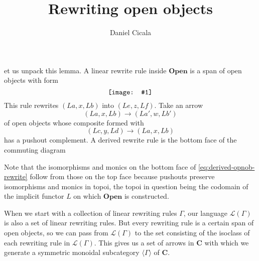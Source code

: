 \documentclass{amsart}
\author{Daniel Cicala}
\title{Rewriting open objects}
\newcommand{\C}{\cat{C}}
\newcommand{\cat}[1]{\mathbf{#1}}
\newcommand{\diagram}[1]{\raisebox{-0.5\height}{\texttt{[image: \#1]}}}
\newcommand{\OpenOb}{\mathbf{Open} }
\newenvironment{exposition}[1]{}{}
\theoremstyle{remark}
\theoremstyle{definition}
\begin{document}
\begin{exposition}

  Let us unpack this lemma.  A linear rewrite rule inside \( \OpenOb \) is
  a span of open objects with form
  \[
    \diagram{diag_lr_rewr-struct-cospans}
  \]
  This rule rewrites \( ( La , x , Lb ) \)
  into \( (  Le , z , Lf ) \). Take an arrow 
  \[
    ( La , x , Lb ) \to ( La' , w , Lb' )
  \]
  of open objects whose composite formed with
  \[
    ( Lc , y , Ld) \to ( La , x , Lb)
  \]
  has a pushout complement. A derived rewrite rule is the bottom
  face of the commuting diagram
  
      
  Note that the isomorphisms and monics on the bottom face of
  \eqref{eq:derived-opnob-rewrite} follow from those on the top face
  because pushouts preserve isomorphisms and monics in topoi, the
  topoi in question being the codomain of the implicit functor \( L \)
  on which \( \OpenOb \) is constructed.

  When we start with a collection of linear rewriting rules \( \Gamma
  \), our language \( \mathcal{ L } ( \Gamma )  \) is also a set of
  linear rewriting rules.  But every rewriting rule is a certain span
  of open objects, so we can pass from \( \mathcal{L} ( \Gamma )  \) to the set
  consisting of the isoclass of each rewriting rule in \( \mathcal{L}
  ( \Gamma ) \). This gives us a set of arrows in \( \C \) with which
  we generate a symmetric monoidal subcategory \( \langle \Gamma \rangle \) of \( \C \). 
    
\end{exposition}
\end{document}
